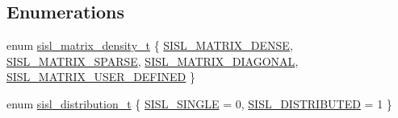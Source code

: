 \subsection*{Enumerations}
\begin{DoxyCompactItemize}
\item 
enum \hyperlink{group__matrix_gae50d4f05ed96de495bdd326c201c28ff}{sisl\+\_\+matrix\+\_\+density\+\_\+t} \{ \hyperlink{group__matrix_ggae50d4f05ed96de495bdd326c201c28ffaae029c486fdd12732f4655d184b0ed57}{S\+I\+S\+L\+\_\+\+M\+A\+T\+R\+I\+X\+\_\+\+D\+E\+N\+S\+E}, 
\hyperlink{group__matrix_ggae50d4f05ed96de495bdd326c201c28ffa0c0ef4a4a8df53f64b9237c1fb4acc75}{S\+I\+S\+L\+\_\+\+M\+A\+T\+R\+I\+X\+\_\+\+S\+P\+A\+R\+S\+E}, 
\hyperlink{group__matrix_ggae50d4f05ed96de495bdd326c201c28ffab0e90537b27c329cce3231200cda3e5f}{S\+I\+S\+L\+\_\+\+M\+A\+T\+R\+I\+X\+\_\+\+D\+I\+A\+G\+O\+N\+A\+L}, 
\hyperlink{group__matrix_ggae50d4f05ed96de495bdd326c201c28ffa64a3cff2469cac8f45575896e548611c}{S\+I\+S\+L\+\_\+\+M\+A\+T\+R\+I\+X\+\_\+\+U\+S\+E\+R\+\_\+\+D\+E\+F\+I\+N\+E\+D}
 \}
\item 
enum \hyperlink{group__matrix_ga03fd8bd724705cd998bb37b51393c0d4}{sisl\+\_\+distribution\+\_\+t} \{ \hyperlink{group__matrix_gga03fd8bd724705cd998bb37b51393c0d4a2c7ad8cda72338a63fc48b67ba475e91}{S\+I\+S\+L\+\_\+\+S\+I\+N\+G\+L\+E} = 0, 
\hyperlink{group__matrix_gga03fd8bd724705cd998bb37b51393c0d4a2719aa856008ad9e5b049874411dc69d}{S\+I\+S\+L\+\_\+\+D\+I\+S\+T\+R\+I\+B\+U\+T\+E\+D} = 1
 \}
\end{DoxyCompactItemize}

